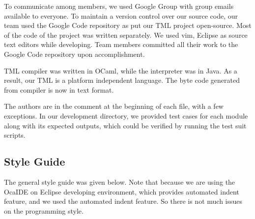 \documentclass[12pt,psfig,a4]{article}
\begin{document}
To communicate among members, we used Google Group with group emails available to everyone. To maintain a version control over our source code, our team used the Google Code repository as put our TML project open-source. Most of the code of the project was written separately. We used vim, Eclipse as source text editors while developing. Team members committed all their work to the Google Code repository upon accomplishment.

TML compiler was written in OCaml, while the interpreter was in Java. As a result, our TML is a platform independent language. The byte code generated from compiler is now in text format. 

The authors are in the comment at the beginning of each file, with a few exceptions. In our development directory, we provided test cases for each module along with its expected outputs, which could be verified by running the test suit scripts.


\subsection{Style Guide}
The general style guide was given below. Note that because we are using the OcaIDE on Eclipse developing environment, which provides automated indent feature, and we used the automated indent feature. So there is not much issues on the programming style.
\end{document}
